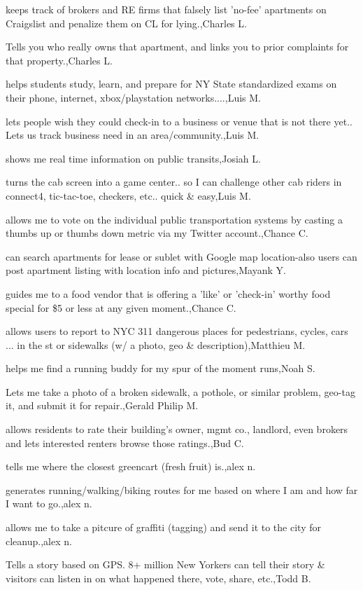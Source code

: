 \documentclass{article}
\begin{document}
keeps track of brokers and RE firms that falsely list 'no-fee' apartments on Craigslist and penalize them on CL for lying.,Charles L.

Tells you who really owns that apartment, and links you to prior complaints for that property.,Charles L.

helps students study, learn, and prepare for NY State standardized exams on their phone, internet, xbox/playstation networks....,Luis M.

lets people wish they could check-in to a business or venue that is not there yet.. Lets us track business need in an area/community.,Luis M.

shows me real time information on public transits,Josiah L.

turns the cab screen into a game center.. so I can challenge other cab riders in connect4, tic-tac-toe, checkers, etc.. quick \& easy,Luis M.

allows me to vote on the individual public transportation systems by casting a thumbs up or thumbs down metric via my Twitter account.,Chance C.

can search apartments for lease or sublet with Google map location-also users can post apartment listing with location info and pictures,Mayank Y.

guides me to a food vendor that is offering a 'like' or 'check-in' worthy food special for \$5 or less at any given moment.,Chance C.

allows users to report to NYC 311 dangerous places for pedestrians, cycles, cars ... in the st or sidewalks (w/ a photo, geo \& description),Matthieu M.

helps me find a running buddy for my spur of the moment runs,Noah S.

Lets me take a photo of a broken sidewalk, a pothole, or similar problem, geo-tag it, and submit it for repair.,Gerald Philip M.

allows residents to rate their building's owner, mgmt co., landlord, even brokers and lets interested renters browse those ratings.,Bud C.

tells me where the closest greencart (fresh fruit) is.,alex n.

generates running/walking/biking routes for me based on where I am and how far I want to go.,alex n.

allows me to take a pitcure of graffiti (tagging) and send it to the city for cleanup.,alex n.

Tells a story based on GPS. 8+ million New Yorkers can tell their story \& visitors can listen in on what happened there, vote, share, etc.,Todd B.
\end{document}

